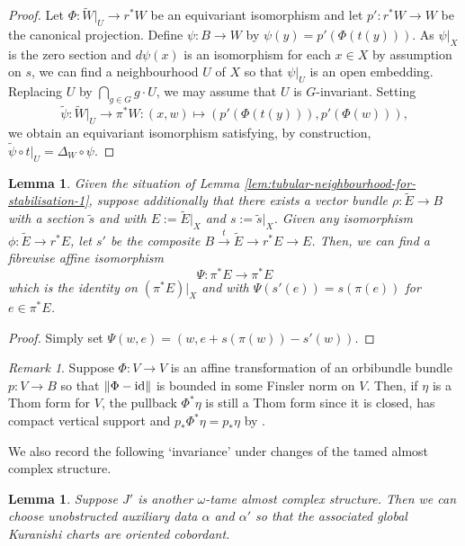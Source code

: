 \documentclass[11pt,psamsfonts, oneside, reqno]{amsart}
\newcommand{\inter}[2]{\bigcap\limits_{#1}{#2}}%
\newcommand{\g}{\circ}%
\newcommand{\norm}[1]{\lVert#1\rVert}
\newcommand{\cl}{\colon}
\newcommand{\xra}{\xrightarrow}
\newcommand{\ide}{\normalfont\text{id}}
\newcommand{\wt}{\widetilde}
\newtheorem{lemma}[theorem]{Lemma}
\theoremstyle{definition}
\theoremstyle{remark}
\newtheorem{remark}[theorem]{Remark}
\numberwithin{equation}{section}
\begin{document}
\begin{proof} Let $\Phi \cl \wt W|_U \to r^*W$ be an equivariant isomorphism and let $p' \cl r^*W\to W$ be the canonical projection. Define $\psi \cl B \to W$ by $\psi(y) = p'(\Phi(t(y)))$. As $\psi|_X$ is the zero section and $d\psi(x)$ is an isomorphism for each $x \in X$ by assumption on $s$, we can find a neighbourhood $U$ of $X$ so that $\psi|_U$ is an open embedding. 
	Replacing $U$ by $\inter{g\in G}{g\cdot U}$, we may assume that $U$ is $G$-invariant. Setting
	$$\wt\psi \cl \wt W|_U \to\pi^*W: (x,w) \mapsto (p'(\Phi(t(y))),p'(\Phi(w))),$$ 
	we obtain an equivariant isomorphism satisfying, by construction, $\wt\psi \g t|_U = \Delta_W\g\psi$.\end{proof}

\begin{lemma}\label{lem:tubular-neighbourhood-for-stabilisation-2} Given the situation of Lemma \ref{lem:tubular-neighbourhood-for-stabilisation-1}, suppose additionally that there exists a vector bundle $\rho\cl \wt E\to B$ with a section $\wt s$ and with $E := \wt E|_X$ and $s := \wt s|_X$. Given any isomorphism $\phi \cl \wt E\to r^*E$, let $s'$ be the composite $B\xra{t}\wt E\to r^*E\to E$. Then, we can find a fibrewise affine isomorphism $$\Psi \cl \pi^*E\to \pi^*E$$ 
	which is the identity on $(\pi^*E)|_X$ and with $\Psi(s'(e)) = s(\pi(e))$ for $e \in \pi^*E$.
\end{lemma}

\begin{proof} Simply set $\Psi(w,e) = (w,e + s(\pi(w))-s'(w))$. 
\end{proof}

\begin{remark}\label{} Suppose $\Phi \cl V\to V$ is an affine transformation of an orbibundle bundle $p\cl V\to B$ so that $\norm{\Phi-\ide}$ is bounded in some Finsler norm on $V$. Then, if $\eta$ is a Thom form for $V$, the pullback $\Phi^*\eta$ is still a Thom form since it is closed, has compact vertical support and $p_*\Phi^*\eta = p_*\eta$ by \cite[Proposition~2.1(4)]{ST16}.\end{remark}

\noindent
We also record the following `invariance' under changes of the tamed almost complex structure. 

\begin{lemma}\label{} Suppose $J'$ is another $\omega$-tame almost complex structure. Then we can choose unobstructed auxiliary data $\alpha$ and $\alpha'$ so that the associated global Kuranishi charts are oriented cobordant.
\end{lemma}
\end{document}
